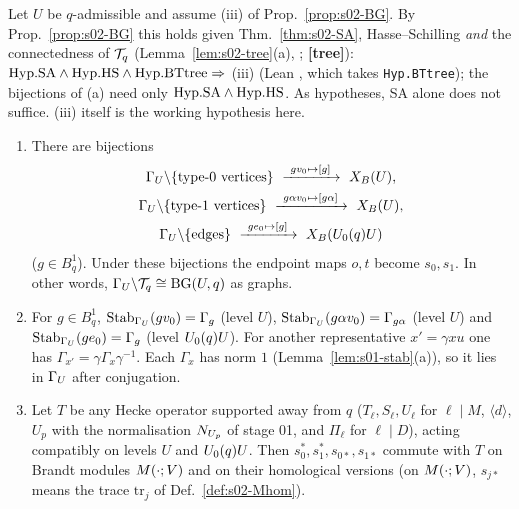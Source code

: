 \begin{proposition}\label{prop:s02-quot}
Let $U$ be $q$-admissible and assume (iii) of Prop.~\ref{prop:s02-BG}. By Prop.~\ref{prop:s02-BG} this holds given
Thm.~\ref{thm:s02-SA}, Hasse--Schilling \emph{and} the connectedness of $\mathcal{T}_q$ (Lemma~\ref{lem:s02-tree}(a), \stcited; \textbf{[tree]}):
$\mathrm{Hyp.SA}\wedge\mathrm{Hyp.HS}\wedge\mathrm{Hyp.BTtree}\Rightarrow$ (iii) (Lean , which takes \texttt{Hyp.BTtree});
the bijections of (a) need only $\mathrm{Hyp.SA}\wedge\mathrm{Hyp.HS}$. As hypotheses, SA alone does not suffice.
(iii) itself is the working hypothesis here.
\begin{enumerate}[label=(\alph*)]
\item There are bijections
  \begin{gather*}
    \GU\backslash\{\text{type-}0\text{ vertices}\}\ \xrightarrow{\ gv_0\mapsto[g]\ }\ \XB{U},\\
    \GU\backslash\{\text{type-}1\text{ vertices}\}\ \xrightarrow{\ g\alpha v_0\mapsto[g\alpha]\ }\ \XB{U},\\
    \GU\backslash\{\text{edges}\}\ \xrightarrow{\ ge_0\mapsto[g]\ }\ \XB{\Uzero{q}U}
  \end{gather*}
  ($g\in B^1_q$). Under these bijections the endpoint maps $o,t$ become $s_0,s_1$. In other words,
  $\Gamma_U\backslash\mathcal{T}_q\cong\mathrm{BG}(U,q)$ as graphs.
\item For $g\in B^1_q$, $\operatorname{Stab}_{\Gamma_U}(gv_0)=\Gamma_g$ (level $U$), $\operatorname{Stab}_{\Gamma_U}(g\alpha v_0)=\Gamma_{g\alpha}$
  (level $U$) and $\operatorname{Stab}_{\Gamma_U}(ge_0)=\Gamma_g$ (level $U_0(q)U$). For another representative
  $x'=\gamma xu$ one has $\Gamma_{x'}=\gamma\Gamma_x\gamma^{-1}$. Each $\Gamma_x$ has norm $1$
  (Lemma~\ref{lem:s01-stab}(a)), so it lies in $\Gamma_U$ after conjugation.
\item Let $T$ be any Hecke operator supported away from $q$ ($T_\ell,S_\ell,U_\ell$ for $\ell\mid M$,
  $\langle d\rangle$, $U_p$ with the normalisation $N_{U_p}$ of stage 01, and $\Pi_\ell$ for $\ell\mid D$),
  acting compatibly on levels $U$ and $U_0(q)U$. Then $s_0^*,s_1^*,s_{0*},s_{1*}$ commute with $T$ on
  Brandt modules $M(\cdot;V)$ and on their homological versions (on $M(\cdot;V)$, $s_{j*}$ means the trace
  $\mathrm{tr}_j$ of Def.~\ref{def:s02-Mhom}).
\end{enumerate}
\end{proposition}
